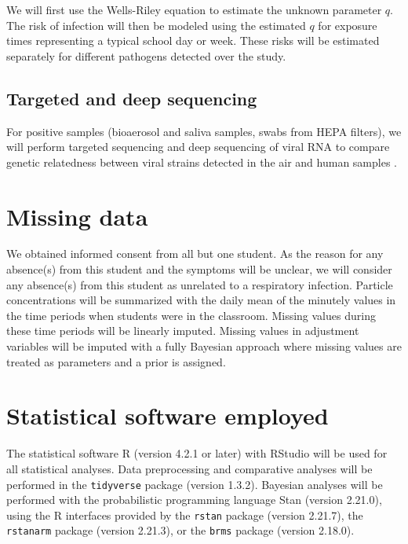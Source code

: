 \documentclass{article}
\begin{document}
We will first use the Wells-Riley equation to estimate the unknown parameter $q$. The risk of infection will then be modeled using the estimated $q$ for exposure times representing a typical school day or week. These risks will be estimated separately for different pathogens detected over the study.  

\subsection{Targeted and deep sequencing}

For positive samples (bioaerosol and saliva samples, swabs from HEPA filters), we will perform targeted sequencing and deep sequencing of viral RNA to compare genetic relatedness between viral strains detected in the air and human samples \cite{Goncalves2021Microorganisms}.

\section{Missing data}

We obtained informed consent from all but one student. As the reason for any absence(s) from this student and the symptoms will be unclear, we will consider any absence(s) from this student as unrelated to a respiratory infection. Particle concentrations will be summarized with the daily mean of the minutely values in the time periods when students were in the classroom. Missing values during these time periods will be linearly imputed. Missing values in adjustment variables will be imputed with a fully Bayesian approach where missing values are treated as parameters and a prior is assigned. 

\section{Statistical software employed}

The statistical software R (version 4.2.1 or later) with RStudio will be used for all statistical analyses. Data preprocessing and comparative analyses will be performed in the \texttt{tidyverse} package (version 1.3.2). Bayesian analyses will be performed with the probabilistic programming language Stan (version 2.21.0), using the R interfaces provided by the \texttt{rstan} package (version 2.21.7), the \texttt{rstanarm} package (version 2.21.3), or the \texttt{brms} package (version 2.18.0).




\end{document}
